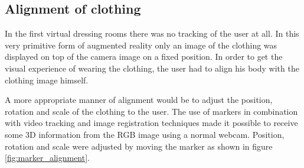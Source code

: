 \documentclass[twocolumn,a4paper]{article}
\begin{document}
\subsection{Alignment of clothing}

In the first virtual dressing rooms there was no tracking of the user at all. In this very primitive form of augmented reality only an image of the clothing was displayed on top of the camera image on a fixed position. In order to get the visual experience of wearing the clothing, the user had to align his body with the clothing image himself. 

A more appropriate manner of alignment would be to adjust the position, rotation and scale of the clothing to the user. The use of markers in combination with video tracking and image registration techniques made it possible to receive some 3D information from the RGB image using a normal webcam. Position, rotation and scale were adjusted by moving the marker as shown in figure \ref{fig:marker_alignment}.
\end{document}
